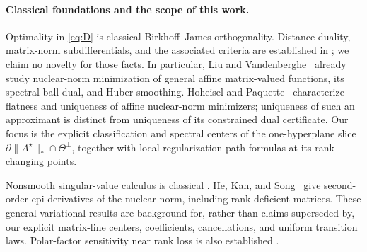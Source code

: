 \paragraph{Classical foundations and the scope of this work.}
Optimality in \eqref{eq:D} is classical Birkhoff--James orthogonality.
Distance duality, matrix-norm subdifferentials, and the associated criteria
are established in
\citep{singer1970best,watson1992subdifferential,zietak1993faces,
watson1993kyfan,bhatia1999orthogonality,grover2014distance,
johnston2022trace,grover2026kyfan}; we claim no novelty for those facts.
In particular, Liu and Vandenberghe~\cite{liu2009nuclear} already study nuclear-norm
minimization of general affine matrix-valued functions, its spectral-ball
dual, and Huber smoothing.  Hoheisel and Paquette~\cite{hoheisel2023uniqueness} characterize
flatness and uniqueness of affine nuclear-norm minimizers; uniqueness of
such an approximant is distinct from uniqueness of its constrained dual
certificate.  Our focus is the explicit classification and spectral centers
of the one-hyperplane slice
\(\partial\|A^\star\|_*\cap\Theta^\perp\), together with local
regularization-path formulas at its rank-changing points.

Nonsmooth singular-value calculus is classical
\citep{lewis2005nonsmooth1,lewis2005nonsmooth2}.
He, Kan, and Song~\cite{he2026twice} give second-order epi-derivatives of the nuclear norm,
including rank-deficient matrices.  These general variational results are
background for, rather than claims superseded by, our explicit
matrix-line centers, coefficients, cancellations, and uniform transition
laws.  Polar-factor sensitivity near rank loss is also established
\citep{higham1986polar,mathias1993polar}.

